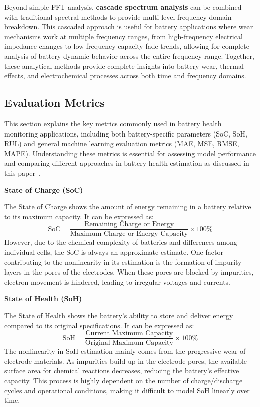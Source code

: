 Beyond simple FFT analysis, \textbf{cascade spectrum analysis} can be combined with traditional spectral methods to provide multi-level frequency domain breakdown. This cascaded approach is useful for battery applications where wear mechanisms work at multiple frequency ranges, from high-frequency electrical impedance changes to low-frequency capacity fade trends, allowing for complete analysis of battery dynamic behavior across the entire frequency range. Together, these analytical methods provide complete insights into battery wear, thermal effects, and electrochemical processes across both time and frequency domains.


\subsection{Evaluation Metrics}

This section explains the key metrics commonly used in battery health monitoring applications, including both battery-specific parameters (SoC, SoH, RUL) and general machine learning evaluation metrics (MAE, MSE, RMSE, MAPE). Understanding these metrics is essential for assessing model performance and comparing different approaches in battery health estimation as discussed in this paper~\cite{ren_review_2023}.

\vspace{1cm}
\textbf{State of Charge (SoC)}

The State of Charge shows the amount of energy remaining in a battery relative to its maximum capacity. It can be expressed as:
\begin{equation}
\text{SoC} = \frac{\text{Remaining Charge or Energy}}{\text{Maximum Charge or Energy Capacity}} \times 100\%
\end{equation}
However, due to the chemical complexity of batteries and differences among individual cells, the SoC is always an approximate estimate. One factor contributing to the nonlinearity in its estimation is the formation of impurity layers in the pores of the electrodes. When these pores are blocked by impurities, electron movement is hindered, leading to irregular voltages and currents.

\vspace{1cm}
\textbf{State of Health (SoH)}

The State of Health shows the battery's ability to store and deliver energy compared to its original specifications. It can be expressed as:
\begin{equation}
\text{SoH} = \frac{\text{Current Maximum Capacity}}{\text{Original Maximum Capacity}} \times 100\%
\end{equation}
The nonlinearity in SoH estimation mainly comes from the progressive wear of electrode materials. As impurities build up in the electrode pores, the available surface area for chemical reactions decreases, reducing the battery's effective capacity. This process is highly dependent on the number of charge/discharge cycles and operational conditions, making it difficult to model SoH linearly over time.


